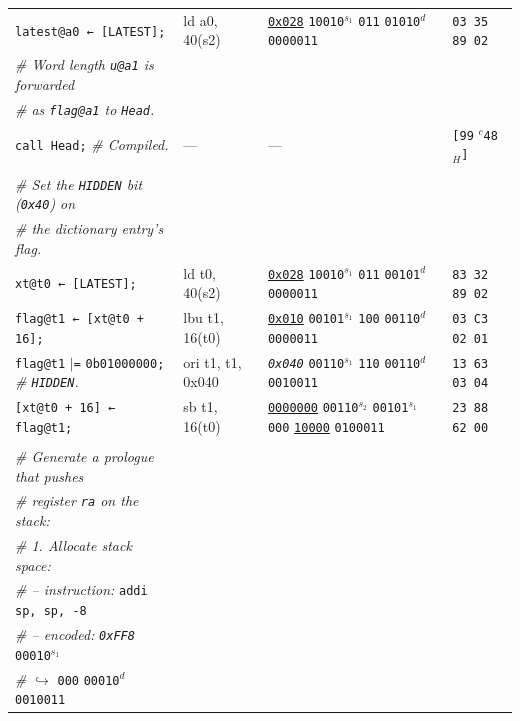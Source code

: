 \documentclass[a4paper,12pt,final]{article}
\begin{document}
\begin{table}[!htbp]
\begin{adjustwidth}{-1cm}{-1cm}
\begin{center}
\begin{tabular}{l|ll|l}
\texttt{latest@a0 ← [LATEST];} & ld a0, 40(s2) & \uline{\texttt{0x028}}                    \texttt{10010}​\(^{s_{1}}\) \texttt{011} \texttt{01010}​\(^{d}\)  \texttt{0000011} & \texttt{03 35 89 02}\\[0pt]
\emph{\# Word length \texttt{u@a1} is forwarded} &  &  & \\[0pt]
\emph{\# as \texttt{flag@a1} to \texttt{Head}.} &  &  & \\[0pt]
\texttt{call Head;}  \emph{\# Compiled.} & --- & --- & \texttt{[99} \(^{c}\)​\texttt{48}​\(_{H}\)​\texttt{]}\\[0pt]
 &  &  & \\[0pt]
\emph{\# Set the \texttt{HIDDEN} bit (\texttt{0x40}) on} &  &  & \\[0pt]
\emph{\# the dictionary entry's flag.} &  &  & \\[0pt]
\texttt{xt@t0 ← [LATEST];} & ld t0, 40(s2) & \uline{\texttt{0x028}}                    \texttt{10010}​\(^{s_{1}}\) \texttt{011} \texttt{00101}​\(^{d}\)  \texttt{0000011} & \texttt{83 32 89 02}\\[0pt]
\texttt{flag@t1 ← [xt@t0 + 16];} & lbu t1, 16(t0) & \uline{\texttt{0x010}}                    \texttt{00101}​\(^{s_{1}}\) \texttt{100} \texttt{00110}​\(^{d}\)  \texttt{0000011} & \texttt{03 C3 02 01}\\[0pt]
\texttt{flag@t1} \(\vert{}\)​\texttt{=} \texttt{0b01000000;}  \emph{\# \texttt{HIDDEN}.} & ori t1, t1, 0x040 & \emph{\texttt{0x040}}                    \texttt{00110}​\(^{s_{1}}\) \texttt{110} \texttt{00110}​\(^{d}\)  \texttt{0010011} & \texttt{13 63 03 04}\\[0pt]
\texttt{[xt@t0 + 16] ← flag@t1;} & sb t1, 16(t0) & \uline{\texttt{0000000}} \texttt{00110}​\(^{s_{2}}\) \texttt{00101}​\(^{s_{1}}\) \texttt{000} \uline{\texttt{10000}} \texttt{0100011} & \texttt{23 88 62 00}\\[0pt]
 &  &  & \\[0pt]
\emph{\# Generate a prologue that pushes} &  &  & \\[0pt]
\emph{\# register \texttt{ra} on the stack:} &  &  & \\[0pt]
\emph{\# 1. Allocate stack space:} &  &  & \\[0pt]
\emph{\# – instruction:} \texttt{addi sp, sp, -8} &  &  & \\[0pt]
\emph{\# – encoded:} \emph{\texttt{0xFF8}} \texttt{00010}​\(^{s_{1}}\) &  &  & \\[0pt]
\emph{\#}\hspace{5.1em} \(\hookrightarrow\) \texttt{000} \texttt{00010}​\(^{d}\)  \texttt{0010011} &  &  & \\[0pt]

\end{tabular}
\end{center}
\end{adjustwidth}
\end{table}
\end{document}
